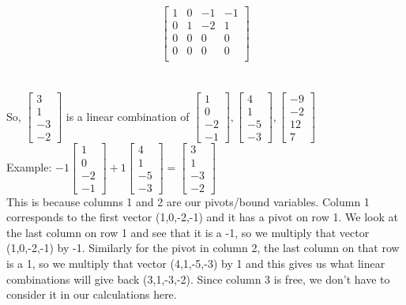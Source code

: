 \documentclass{article}
\begin{document}
{$$
\begin{bmatrix} 
1 & 0 & -1 & -1 \\ 
0 & 1 & -2 & 1 \\
0 & 0 & 0 & 0 \\
0 & 0 & 0 & 0 \\
\end{bmatrix}
$$\\
\\
So, $\left[\begin{matrix} 3 \\ 1 \\ -3 \\ -2 \end{matrix}\right]$ is a linear combination of 
$\left[\begin{matrix} 1 \\ 0 \\ -2 \\ -1 \end{matrix}\right],
\left[\begin{matrix} 4 \\ 1 \\ -5 \\ -3 \end{matrix}\right],
\left[\begin{matrix} -9 \\ -2 \\ 12 \\ 7 \end{matrix}\right]$ \\

Example:
$-1\left[\begin{matrix} 1 \\ 0 \\ -2 \\ -1 \end{matrix}\right]
+1\left[\begin{matrix} 4 \\ 1 \\ -5 \\ -3 \end{matrix}\right] = 
\left[\begin{matrix} 3 \\ 1 \\ -3 \\ -2 \end{matrix}\right]$ \\

This is because columns 1 and 2 are our pivots/bound variables. Column 1 corresponds to the first vector (1,0,-2,-1) and it has a pivot on row 1. We look at the last column on row 1 and see that it is a -1, so we multiply that vector (1,0,-2,-1) by -1. Similarly for the pivot in column 2, the last column on that row is a 1, so we multiply that vector (4,1,-5,-3) by 1 and this gives us what linear combinations will give back (3,1,-3,-2). Since column 3 is free, we don't have to consider it in our calculations here.
\newpage
}
\end{document}
